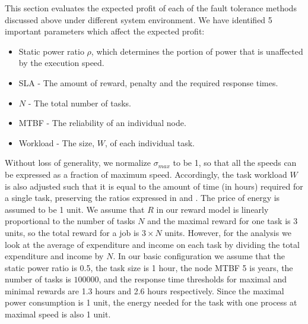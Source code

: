 \noindent 

This section evaluates the expected profit of each of the fault tolerance
methods discussed above under different system environment. We have identified 5
important parameters which affect the expected profit:
\begin{itemize}
\item Static power ratio $\rho$, which determines the portion of power that is unaffected by the execution speed.
\item SLA - The amount of reward, penalty and the required response times.
\item $N$ - The total number of tasks.
\item MTBF - The reliability of an individual node.
\item Workload - The size, $W$, of each individual task.
\end{itemize}


%



Without loss of generality, we normalize $\sigma_{max}$ to be 1, so
that all the speeds can be expressed as a fraction of maximum
speed. Accordingly, the task workload $W$ is also adjusted such that
it is equal to the amount of time (in hours) required for a single
task, preserving the ratios expressed in
 and . The price of
energy is assumed to be 1 unit. We assume that $R$ in our reward model
is linearly proportional to the number of tasks $N$ and the maximal
reward for one task is 3 units, so the total reward for a job is $3
\times N$ units.  However, for the analysis we look
at the average of expenditure and income on each task by dividing the
total expenditure and income by $N$. In our basic configuration we
assume that the static power ratio is 0.5, the task size is 1 hour, the node MTBF 5 is
years, the number of tasks is $100000$, and the response time thresholds for
maximal and minimal rewards are 1.3 hours and 2.6 hours
respectively. Since the maximal power consumption is 1 unit, the
energy needed for the task with one process at maximal speed is also 1
unit. 

